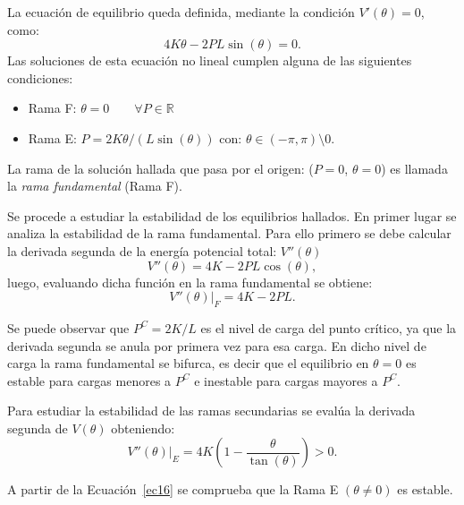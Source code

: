 La ecuación de equilibrio queda definida, mediante la condición $V'(\theta)=0$, como:
%
\begin{equation}\label{SymBif_Eq}
4K\theta - 2PL\sin(\theta)=0.
\end{equation}
%
Las soluciones de esta ecuación no lineal cumplen alguna de las siguientes condiciones:
%
\begin{itemize}
	\item Rama F: $\theta=0 \qquad \forall P\in\mathbb{R}$
	\item Rama E: $P= 2K\theta /(L\sin(\theta))$ con: $\theta\in(-\pi,\pi)\setminus0$.
\end{itemize}

La rama de la solución hallada que pasa por el origen: ($P=0$, $\theta=0$) es llamada la \textit{rama fundamental} (Rama F).

Se procede a estudiar la estabilidad de los equilibrios hallados. En primer lugar se analiza la estabilidad de la rama fundamental. Para ello primero se debe calcular la derivada segunda de la energía potencial total: $V''(\theta)$
%
\begin{equation}
V''(\theta)=4K - 2PL\cos(\theta),
\end{equation}
%
luego, evaluando dicha función en la rama fundamental se obtiene:
%
\begin{equation}
\left.V''(\theta)\right|_F=4K - 2PL.
\end{equation}

Se puede observar que $P^C=2K/L$ es el nivel de carga del punto crítico, ya que la derivada segunda se anula por primera vez para esa carga. %
%
En dicho nivel de carga la rama fundamental se bifurca, es decir que el equilibrio en $\theta=0$ es estable para cargas menores a $P^C$ e inestable para cargas mayores a $P^C$.

Para estudiar la estabilidad de las ramas secundarias se evalúa la derivada segunda de $V(\theta)$ obteniendo:
%
\begin{equation}\label{ec16}
  \left.V''(\theta)\right|_E=4K\left(1-\frac{\theta}{\tan(\theta)}\right)>0.
\end{equation}

A partir de la Ecuación~\eqref{ec16} se comprueba que la Rama E $(\theta\neq0)$ es estable.



